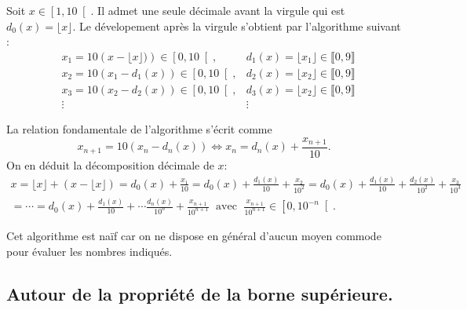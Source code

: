 \begin{prop}
Soit $x\in \left[ 1, 10 \right[$. Il admet une seule décimale avant la virgule qui est $d_0(x) = \lfloor x \rfloor$. \newline
Le dévelopement après la virgule s'obtient par l'algorithme suivant :
\begin{align*}
 &x_1 = 10\left( x - \lfloor x\rfloor)\right) \in \left[ 0, 10 \right[,  &d_1(x) = \lfloor x_1 \rfloor \in \llbracket 0, 9 \rrbracket \\
 &x_2 = 10\left( x_1 - d_1(x)\right) \in \left[ 0, 10 \right[,           &d_2(x) = \lfloor x_2 \rfloor \in \llbracket 0, 9 \rrbracket \\
 &x_3 = 10\left( x_2 - d_2(x)\right) \in \left[ 0, 10 \right[,           &d_3(x) = \lfloor x_2 \rfloor \in \llbracket 0, 9 \rrbracket \\
 &\vdots &\vdots 
\end{align*}
\end{prop}
\begin{demo}
 La relation fondamentale de l'algorithme s'écrit comme 
\[
  x_{n+1} = 10(x_n - d_n(x)) \Leftrightarrow x_n = d_n(x) + \frac{x_{n+1}}{10}.
\]
On en déduit la décomposition décimale de $x$:
\begin{multline*}
  x = \lfloor x \rfloor + (x - \lfloor x \rfloor) = d_0(x) + \frac{x_1}{10}
  = d_0(x) + \frac{d_1(x)}{10} + \frac{x_2}{10^2}
  = d_0(x) + \frac{d_1(x)}{10} + \frac{d_2(x)}{10^2} + \frac{x_3}{10^3}\\
  = \cdots = d_0(x) + \frac{d_1(x)}{10} + \cdots \frac{d_n(x)}{10^n} + \frac{x_{n+1}}{10^{n+1}}
  \;\text{ avec }\; \frac{x_{n+1}}{10^{n+1}} \in \left[ 0, 10^{-n} \right[.
\end{multline*}

\end{demo}
Cet algorithme est naïf car on ne dispose en général d'aucun moyen commode pour évaluer les nombres indiqués. 

\subsection{Autour de la propriété de la borne supérieure.}


